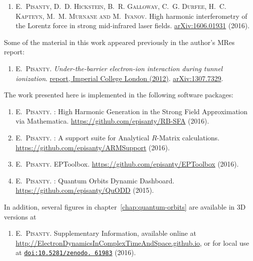 \begin{enumerate}
\item[{\hypersetup{citecolor=black}\cite{Pisanty_lorentz_2016}}]
\textsc{E.~Pisanty, D.~D. Hickstein, B.~R. Galloway, C.~G. Durfee, H.~C. Kap\-teyn, M.~M. Murnane and M.~Ivanov}.
\newblock High harmonic interferometry of the {L}orentz force in strong
  mid-infrared laser fields.
\newblock \href{http://arxiv.org/abs/1606.01931}{arXiv:1606.01931} (2016).
\end{enumerate}

\noindent
Some of the material in this work appeared previously in the author's MRes report:
\begin{enumerate}
\item[{\hypersetup{citecolor=black}\cite{MResReport}}]
\textsc{E.~Pisanty}.
\newblock \emph{Under-the-barrier electron-ion interaction during tunnel
  ionization}. 
  \href{http://www3.imperial.ac.uk/controlledquantumdynamics/people/students/cohortthree/emiliopisantyalatorre }{
 report, Imperial College London (2012)}.
\newblock \href{http://arxiv.org/abs/1307.7329}{arXiv:1307.7329}.
\end{enumerate}


\noindent
The work presented here is implemented in the following software packages:

\begin{enumerate}
\item[{\hypersetup{citecolor=black}\cite{RB-SFA}}]
\textsc{E.~Pisanty}.
: {H}igh {H}armonic {G}eneration in the {S}trong {F}ield
  {A}pproximation via {M}athematica.
\newblock \url{https://github.com/episanty/RB-SFA} (2016).

\item[{\hypersetup{citecolor=black}\cite{ARMSupport}}]
\textsc{E.~Pisanty}.
: {A} support suite for {A}nalytical {$R$}-{M}atrix
  calculations.
\newblock \url{https://github.com/episanty/ARMSupport} (2016).

\item[{\hypersetup{citecolor=black}\cite{EPToolbox}}]
\textsc{E.~Pisanty}. EPToolbox. \url{https://github.com/episanty/EPToolbox} (2016).

\item[{\hypersetup{citecolor=black}\cite{QuODD}}]
\textsc{E.~Pisanty}.
: Quantum Orbits Dynamic Dashboard.
\newblock \url{https://github.com/episanty/QuODD} (2015).
\end{enumerate}

\noindent
In addition, several figures in chapter~\ref{chap:quantum-orbits} are available in 3D versions at
\begin{enumerate}
\item[{\hypersetup{citecolor=black}\cite{SupplementaryInformation}}]
\textsc{E.~Pisanty}. Supplementary Information, available online at \url{http://ElectronDynamicsInComplexTimeAndSpace.github.io}, or for local use at \href{http://dx.doi.org/10.5281/zenodo.61983}{\texttt{doi:10.5281/zenodo. 61983}} (2016).
\end{enumerate}


